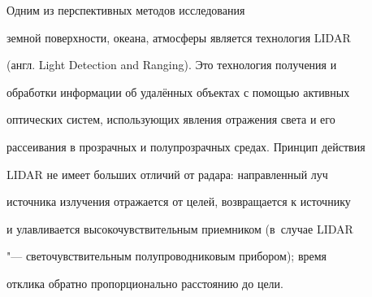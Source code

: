 










\date{25/VIII/2011}




\maketitle







 Одним из перспективных методов исследования

земной поверхности, океана, атмосферы является технология LIDAR

(англ. Light De\-tec\-tion and Ranging). Это технология получения и

обработки информации об удалённых объектах с помощью активных

оптических систем, использующих явления отражения света и его

рассеивания в прозрачных и полупрозрачных средах. Принцип действия

LIDAR не имеет больших отличий от радара: направленный луч

источника излучения отражается от целей, возвращается к источнику

и улавливается высокочувствительным приемником (в~случае LIDAR

"--- светочувствительным полупроводниковым прибором); время

отклика обратно пропорционально расстоянию до цели.



